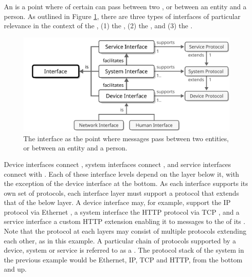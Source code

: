 An  is a point where  of certain  can pass between two , or between an entity and a person.
As outlined in Figure \ref{fig:interface}, there are three types of interfaces of particular relevance in the context of the , (1) the , (2) the , and (3) the .

\begin{figure}[ht!]
  \centering
  \includegraphics[scale=0.9]{figures/interface}
  \caption{
    The interface as the point where messages pass between two entities, or between an entity and a person.
  }
  \label{fig:interface}
\end{figure}

Device interfaces connect , system interfaces connect , and service interfaces connect  with .
Each of these interface levels depend on the layer below it, with the exception of the device interface at the bottom.
As each interface supports its own set of protocols, each interface layer must support a protocol that extends that of the below layer.
A device interface may, for example, support the IP \cite{deering2017internet} protocol via Ethernet \cite{iso202188023}, a system interface the HTTP \cite{fielding2014hypertext} protocol via TCP \cite{postel1981transmission}, and a service interface a custom HTTP extension enabling it to  messages to the  of its .
Note that the protocol at each layers may consist of multiple protocols extending each other, as in this example.
A particular chain of protocols supported by a device, system or service is referred to as a .
The protocol stack of the system in the previous example would be Ethernet, IP, TCP and HTTP, from the bottom and up.

